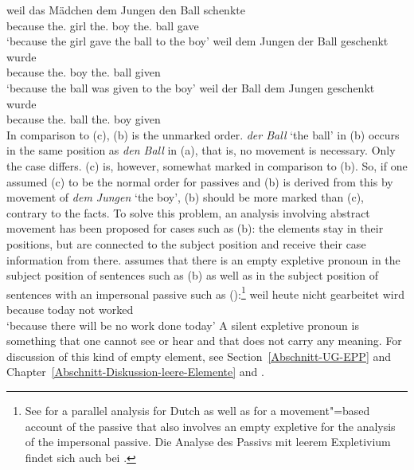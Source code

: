 \eal
\label{ex-passive-German-no-movement}
\ex 
\gll weil    das        Mädchen dem Jungen den Ball schenkte\\
     because the.\nom{} girl    the.\dat{} boy the.\acc{} ball gave\\
\glt `because the girl gave the ball to the boy'
\ex 
\gll weil dem Jungen der Ball geschenkt wurde\\
     because the.\dat{} boy the.\nom{} ball given \AUX\\
\glt `because the ball was given to the boy'
\ex 
\gll weil der Ball dem Jungen geschenkt wurde\\
     because the.\nom{} ball the.\dat{} boy given \AUX\\
\zl
In comparison to (c), (b) is the unmarked order. \emph{der Ball} `the ball' in (b) occurs
in the same position as \emph{den Ball} in (a), that is, no movement is necessary. Only the case differs.
(c) is, however, somewhat marked in comparison to (b). So, if one assumed (c) to
be the normal order for passives and (b) is derived from this by movement of \emph{dem
  Jungen} `the boy', (b) should be more marked than (c), contrary to the facts. 
To solve this problem, an analysis involving abstract movement has been proposed for
cases such as (b): the elements stay in their positions, but are connected to
the subject position and receive their case information from there. \textcites[155--157]{Grewendorf88a}[]{Grewendorf93}
assumes that there is an empty expletive pronoun
in the subject position of sentences such as (b) as well as in the subject position of sentences with an
impersonal passive such as ():\footnote{%
	See  for a parallel analysis for Dutch as well as 
	 for a movement"=based account of the passive that also involves an
        empty expletive for the analysis of the impersonal passive. Die Analyse des Passivs mit leerem
        Expletivium findet sich auch bei \citet[462--463]{SS88a}.
}
\ea
\gll weil heute nicht gearbeitet wird\\
	 because today not worked \AUX\\
\glt `because there will be no work done today'
\z
A silent expletive pronoun is something that one cannot see or hear and that does not carry any meaning. For discussion of 
this kind of empty element, see Section~\ref{Abschnitt-UG-EPP} and
Chapter~\ref{Abschnitt-Diskussion-leere-Elemente} and .


